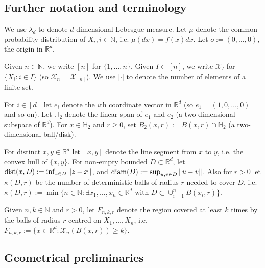 \documentclass[12pt]{article}
\newcommand{\N}{\mathbb{N}}
\newcommand{\cX}{\mathcal{X}}
\newcommand{\diam}{{\rm diam}}
\newcommand{\R}{\mathbb{R}}
\newcommand{\dist}{{\rm dist}}
\begin{document}
 \subsection{Further notation and terminology}
 \label{ss:notation}
We use $\lambda_d$ to denote $d$-dimensional Lebesgue measure.
Let $\mu$ denote the common probability distribution of $X_i, i \in \N$,
i.e. $\mu(dx) = f(x) dx$. Let $o:= (0,\ldots,0)$, the origin in $\R^d$.

 Given $n \in \N$, we write $[n]$ for $\{1,\ldots,n\}$.
 Given $I \subset [n]$, we write $\cX_I$ for $\{X_i: i \in I\}$
 (so $\cX_n = \cX_{[n]}$).
 We use $|\cdot|$ to denote the number of elements of a finite set.


For $i \in [d]$ let $e_i $ denote the $i$th coordinate vector
in $\R^d$
(so $e_1= (1,0,\ldots,0)$ and so on).
Let $\mathbb H_2$
denote the linear span of $e_1$ and $e_2$ (a two-dimensional subspace
of $\R^d$). For $x \in \mathbb H_2$ and $r \geq 0$, set $B_2(x,r):=
B(x,r) \cap \mathbb H_2$ (a two-dimensional ball/disk).

For distinct $x,y \in \R^d$ let $[x,y]$ denote the line segment from $x$ to $y$,
i.e. the convex hull of $\{x,y\}$.
 For non-empty bounded $D \subset \R^d$,  let
 $\dist(x,D):= \inf_{z \in D} \|z-x\|$, and
 $\diam(D) := \sup_{u,v \in D} \|u-v\|$.
 Also for $r>0$ let
	$\kappa(D,r)$ be the number of deterministic
	balls of radius $r$ needed
	to cover $D$, i.e.
	 $\kappa(D,r) := \min \{n \in \N: \exists x_1,\ldots,x_n
	\in \R^d$ with $D \subset \cup_{i=1}^n B(x_i,r)\}$.

 


Given $n,k \in \N$ and $r >0$,
	let $F_{n,k,r}$ denote the region covered at least $k$ times by the
	balls of radius $r$ centred on $X_1,\ldots,X_n$, i.e.
	$F_{n,k,r}:= \{x \in \R^d: \cX_n(B(x,r)) \geq k\}$.




 \subsection{Geometrical preliminaries}
\end{document}
